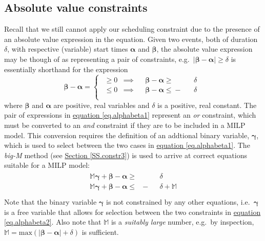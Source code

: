 \subsection{Absolute value constraints}\label{SS.absval}
Recall that we still cannot apply our scheduling constraint due to the presence
of an absolute value expression in the equation.
Given two events, both of duration $\delta$, with respective (variable) start
times $\boldsymbol{\alpha}$ and $\boldsymbol{\beta}$, the absolute
value expression may be though of as representing a pair of constraints, e.g.\ 
$ \lvert \boldsymbol{\beta} - \boldsymbol{\alpha} \rvert \ge \delta $
is essentially shorthand for the expression
\begin{equation}
    \boldsymbol{\beta} - \boldsymbol{\alpha} = 
    \begin{cases}
        \begin{alignedat}{6}
            \ge{} 0 &\implies &&\boldsymbol{\beta} {}-{} \boldsymbol{\alpha}
            {}\ge{} &&\delta\\
            \le{} 0 &\implies &&\boldsymbol{\beta} {}-{} \boldsymbol{\alpha}
            {}\le{} - &&\delta\\
        \end{alignedat}
    \end{cases}
    \label{eq.alphabeta1}
\end{equation}
where $\boldsymbol{\beta}$ and $\boldsymbol{\alpha}$ are positive, real
variables and $\delta$ is a positive, real constant.
The pair of expressions in 
\hyperref[eq.alphabeta1]{equation \ref*{eq.alphabeta1}}
represent an \emph{or} constraint, which must be converted to an \emph{and}
constraint if they are to be included in a MILP model.
This conversion requires the definition of an addtional binary variable,
$\boldsymbol{\gamma}$, which is used to select between the two cases in
\hyperref[eq.alphabeta1]{equation \ref*{eq.alphabeta1}}.
The \emph{big-M} method (see \hyperref[SS.constr3]{Section \ref*{SS.constr3}})
is used to arrive at correct equations suitable for a
MILP model:
\begin{equation}
    \begin{split}
        \begin{alignedat}{4}
            \mathbb{M} \boldsymbol{\gamma} + \boldsymbol{\beta} 
            - \boldsymbol{\alpha} {}\ge{} & &&\delta\\
            \mathbb{M} \boldsymbol{\gamma} + \boldsymbol{\beta}
            - \boldsymbol{\alpha} {}\le{} & - &&\delta {}+{} \mathbb{M}\\
        \end{alignedat}
    \end{split}
    \label{eq.alphabeta2}
\end{equation}
Note that the binary variable $\boldsymbol{\gamma}$ is not constrained by any
other equations, i.e.\ $\boldsymbol{\gamma}$ is a free variable that allows for
selection between the two constraints in
\hyperref[eq.alphabeta2]{equation \ref*{eq.alphabeta2}}.
Also note that $\mathbb{M}$ is a \emph{suitably large} number, e.g.\ by 
inspection,
$\mathbb{M} =  \text{max} \left(|\boldsymbol{\beta} - \boldsymbol{\alpha}|
 + \delta \right)$ is sufficient.

